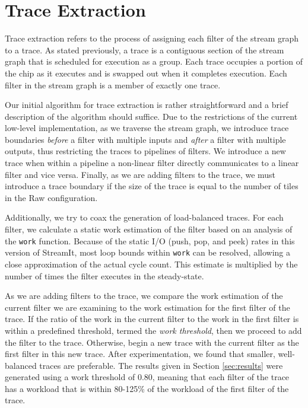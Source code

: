 \section{Trace Extraction}
\label{sec:extraction}	
Trace extraction refers to the process of assigning each filter of the
stream graph to a trace.  As stated previously, a trace is a
contiguous section of the stream graph that is scheduled for execution
as a group. Each trace occupies a portion of the chip as it executes
and is swapped out when it completes execution.  Each filter in the
stream graph is a member of exactly one trace.

Our initial algorithm for trace extraction is rather straightforward
and a brief description of the algorithm should suffice.  Due to the
restrictions of the current low-level implementation, as we traverse
the stream graph, we introduce trace boundaries {\it before} a filter
with multiple inputs and {\it after} a filter with multiple outputs,
thus restricting the traces to pipelines of filters. We introduce a
new trace when within a pipeline a non-linear filter directly
communicates to a linear filter and vice versa. Finally, as we are
adding filters to the trace, we must introduce a trace boundary if the
size of the trace is equal to the number of tiles in the Raw
configuration.


Additionally, we try to coax the generation of load-balanced traces.
For each filter, we calculate a static work estimation of the filter
based on an analysis of the {\tt work} function.  Because of the
static I/O (push, pop, and peek) rates in this version of StreamIt,
most loop bounds within {\tt work} can be resolved, allowing a close
approximation of the actual cycle count.  This estimate is multiplied
by the number of times the filter executes in the steady-state.

As we are adding filters to the trace, we compare the work estimation
of the current filter we are examining to the work estimation for the
first filter of the trace.  If the ratio of the work in the current
filter to the work in the first filter is within a predefined
threshold, termed the {\it work threshold}, then we proceed to add the
filter to the trace.  Otherwise, begin a new trace with the current
filter as the first filter in this new trace.  After experimentation,
we found that smaller, well-balanced traces are preferable.  The
results given in Section \ref{sec:results} were generated using a work
threshold of 0.80, meaning that each filter of the trace has a
workload that is within 80-125\% of the workload of the first filter
of the trace.

